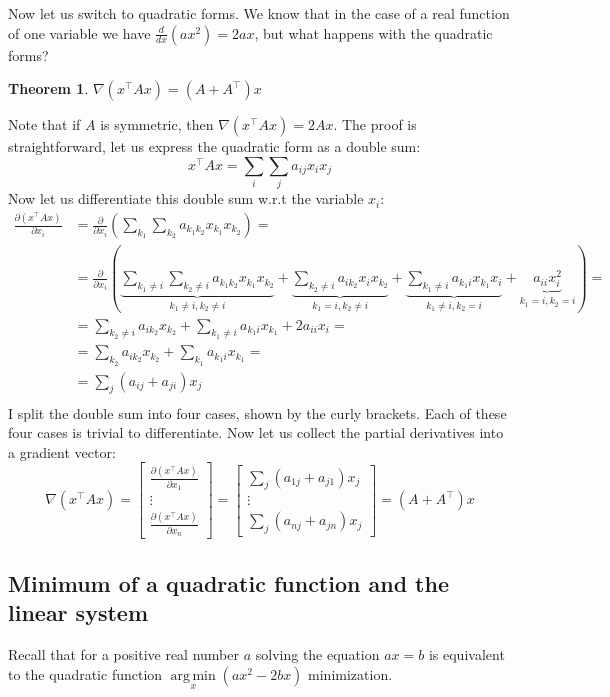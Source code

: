 \documentclass[notitlepage,oneside]{book}
\DeclareMathOperator*{\argmin}{arg\,min}
\newtheorem{theorem}{Theorem}
\begin{document}
Now let us switch to quadratic forms.
We know that in the case of a real function of one variable we have $\frac{d}{dx}(ax^2) = 2ax$, but what happens with the quadratic forms?
\begin{theorem}
$\nabla (x^\top A x) = (A+A^\top)x$
\end{theorem}
Note that if $A$ is symmetric, then $\nabla (x^\top A x) = 2Ax$.
The proof is straightforward, let us express the quadratic form as a double sum:
$$x^\top A x = \sum\limits_i\sum\limits_j a_{ij} x_i x_j$$
Now let us differentiate this double sum w.r.t the variable $x_i$:
\begin{align*}
\frac{\partial (x^\top A x)}{\partial x_i} 
&= \frac{\partial}{\partial x_i}  \left(\sum\limits_{k_1}\sum\limits_{k_2} a_{k_1 k_2} x_{k_1} x_{k_2}\right) = \\
&= \frac{\partial}{\partial x_i}  \left(
\underbrace{\sum\limits_{k_1\neq i}\sum\limits_{k_2\neq i} a_{k_1k_2}x_{k_1} x_{k_2}}_{k_1 \neq i, k_2 \neq i}+\underbrace{\sum\limits_{k_2\neq i} a_{ik_2}x_i x_{k_2}}_{k_1 = i, k_2\neq i}+
\underbrace{\sum\limits_{k_1\neq i} a_{k_1 i} x_{k_1} x_i}_{k_1 \neq i, k_2 = i}+
\underbrace{a_{ii}x_i^2}_{k_1 = i, k_2 = i}\right) = \\
& = \sum\limits_{k_2\neq i} a_{ik_2}x_{k_2} + \sum\limits_{k_1\neq i} a_{k_1 i} x_{k_1} + 2 a_{ii} x_i = \\
& = \sum\limits_{k_2} a_{ik_2}x_{k_2} + \sum\limits_{k_1} a_{k_1 i} x_{k_1} = \\
& = \sum\limits_{j} (a_{ij} + a_{ji}) x_j \\
\end{align*}
I split the double sum into four cases, shown by the curly brackets.
Each of these four cases is trivial to differentiate. 
Now let us collect the partial derivatives  into a gradient vector:
$$\nabla(x^\top A x) = \begin{bmatrix}\frac{\partial (x^\top Ax)}{\partial x_1} \\ \vdots \\ \frac{\partial (x^\top A x)}{\partial x_n} \end{bmatrix}  = \begin{bmatrix}\sum\limits_{j} (a_{1j} + a_{j1}) x_j \\ \vdots \\ \sum\limits_{j} (a_{nj} + a_{jn}) x_j \end{bmatrix}  = (A+A^\top)x
$$

\subsection{Minimum of a quadratic function and the linear system}
Recall that for a positive real number $a$ solving the equation
$ax=b$ is equivalent to the quadratic function $\argmin\limits_x(ax^2 - 2bx)$ minimization.
\end{document}

